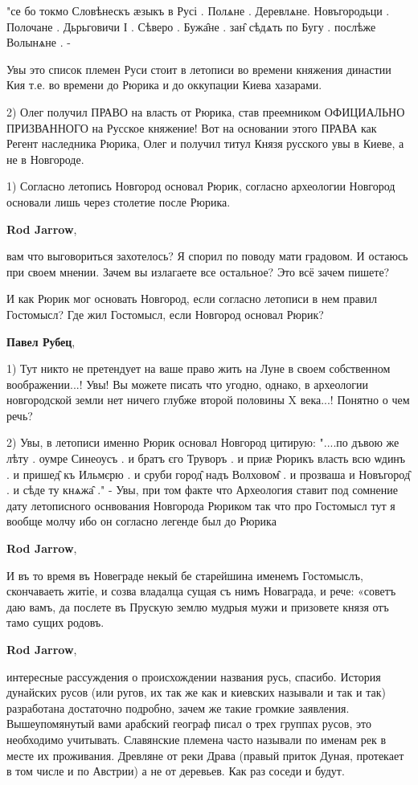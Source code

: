 \begin{itemize}
\begin{itemize}
"се бо токмо Словѣнескъ ӕзыкъ в Русі . Полѧне . Деревлѧне. Новъгородьци .
Полочане . Дьрьговичи І . Сѣверо . Бужа̑не . зан̑ сѣдѧть по Бугу . послѣже
Волынѧне . -

Увы это список племен Руси стоит в летописи во времени княжения династии Кия
т.е. во времени до Рюрика и до оккупации Киева хазарами.

2) Олег получил ПРАВО на власть от Рюрика, став преемником ОФИЦИАЛЬНО
ПРИЗВАННОГО на Русское княжение! Вот на основании этого ПРАВА как Регент
наследника Рюрика, Олег и получил титул Князя русского увы в Киеве, а не в
Новгороде.

1) Согласно летопись Новгород основал Рюрик, согласно археологии Новгород
основали лишь через столетие после Рюрика.

\textbf{Rod Jarrow}, 

вам что выговориться захотелось? Я спорил по поводу мати градовом. И остаюсь при
своем мнении. Зачем вы излагаете все остальное? Это всё зачем пишете?

И как Рюрик мог основать Новгород, если согласно летописи в нем правил
Гостомысл? Где жил Гостомысл, если Новгород основал Рюрик?

\textbf{Павел Рубец}, 

1) Тут никто не претендует на ваше право жить на Луне в своем собственном
воображении...! Увы! Вы можете писать что угодно, однако, в археологии
новгородской земли нет ничего глубже второй половины X века...! Понятно о чем
речь? 

2) Увы, в летописи именно Рюрик основал Новгород цитирую: "....по дъвою же лѣту
. оумре Синеоусъ . и братъ єго Труворъ . и приӕ Рюрикъ власть всю ѡдинъ . и
пришед̑ къ Ильмєрю . и сруби город̑ надъ Волховом̑ . и прозваша и Новъгород̑ .  и
сѣде ту кнѧжа̑ ." - Увы, при том факте что Археология ставит под сомнение дату
летописного оснвования Новгорода Рюриком так что про Гостомысл тут я вообще
молчу ибо он согласно легенде был до Рюрика

\textbf{Rod Jarrow}, 

И въ то время въ Новеграде некый бе старейшина именемъ Гостомыслъ, скончаваеть
житіе, и созва владалца сущая съ нимъ Новаграда, и рече: «советъ даю вамъ, да
послете въ Прускую землю мудрыя мужи и призовете князя отъ тамо сущих родовъ.

\textbf{Rod Jarrow}, 

интересные рассуждения о происхождении названия русь, спасибо. История
дунайских русов (или ругов, их так же как и киевских называли и так и так)
разработана достаточно подробно, зачем же такие громкие заявления.
Вышеупомянутый вами арабский географ писал о трех группах русов, это необходимо
учитывать. Славянские племена часто называли по именам рек в месте их
проживания. Древляне от реки Драва (правый приток Дуная, протекает в том числе
и по Австрии) а не от деревьев. Как раз соседи и будут.


\end{itemize}
\end{itemize}
